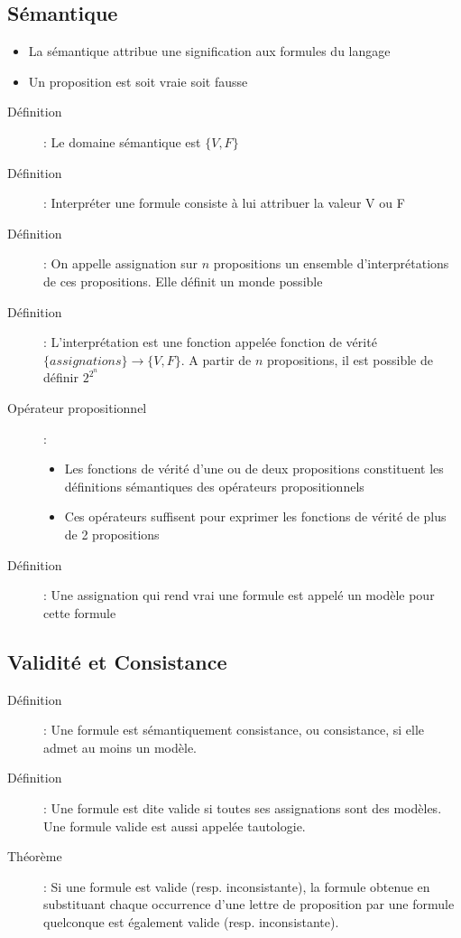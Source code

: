 \documentclass[10pt,a4paper]{article}
\begin{document}
	\subsection{Sémantique}
		\begin{itemize}
			\item La sémantique attribue une signification aux formules du langage
			\item Un proposition est soit vraie soit fausse
		\end{itemize}
		\begin{description}
			\item[Définition]: Le domaine sémantique est $\{V, F\}$
			\item[Définition]: Interpréter une formule consiste à lui attribuer la valeur V ou F
			\item[Définition]: On appelle assignation sur $n$ propositions un ensemble d'interprétations de ces propositions. Elle définit un monde possible
			\item[Définition]: L'interprétation est une fonction appelée fonction de vérité $\{assignations\}\longrightarrow\{V,F\}$. A partir de $n$ propositions, il est possible de définir $2^{2^n}$
			\item[Opérateur propositionnel]:
			\begin{itemize}
				\item Les fonctions de vérité d'une ou de deux propositions constituent les définitions sémantiques des opérateurs propositionnels
				\item Ces opérateurs suffisent pour exprimer les fonctions de vérité de plus de 2 propositions
			\end{itemize}
			\item[Définition]: Une assignation qui rend vrai une formule est appelé un modèle pour cette formule
		\end{description}
	\subsection{Validité et Consistance}
		\begin{description}
			\item[Définition]: Une formule est sémantiquement consistance, ou consistance, si elle admet au moins un modèle.
			\item[Définition]: Une formule est dite valide si toutes ses assignations sont des modèles. Une formule valide est aussi appelée tautologie.
			\item[Théorème]: Si une formule est valide (resp. inconsistante), la formule obtenue en substituant chaque occurrence d'une lettre de proposition par une formule quelconque est également valide (resp. inconsistante).
		\end{description}
\end{document}

